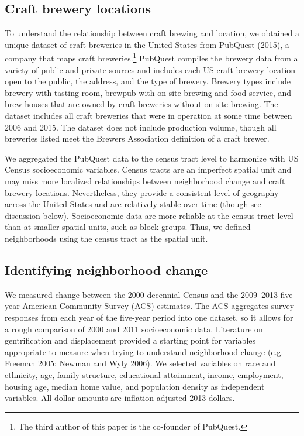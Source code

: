 \documentclass[]{article}
\begin{document}
\subsection{Craft brewery locations}\label{craft-brewery-locations}

To understand the relationship between craft brewing and location, we
obtained a unique dataset of craft breweries in the United States from
PubQuest (2015), a company that maps craft breweries.\footnote{The third
  author of this paper is the co-founder of PubQuest.} PubQuest compiles
the brewery data from a variety of public and private sources and
includes each US craft brewery location open to the public, the address,
and the type of brewery. Brewery types include brewery with tasting
room, brewpub with on-site brewing and food service, and brew houses
that are owned by craft breweries without on-site brewing. The dataset
includes all craft breweries that were in operation at some time between
2006 and 2015. The dataset does not include production volume, though
all breweries listed meet the Brewers Association definition of a craft
brewer.

We aggregated the PubQuest data to the census tract level to harmonize
with US Census socioeconomic variables. Census tracts are an imperfect
spatial unit and may miss more localized relationships between
neighborhood change and craft brewery locations. Nevertheless, they
provide a consistent level of geography across the United States and are
relatively stable over time (though see discussion below). Socioeconomic
data are more reliable at the census tract level than at smaller spatial
units, such as block groups. Thus, we defined neighborhoods using the
census tract as the spatial unit.

\subsection{Identifying neighborhood
change}\label{identifying-neighborhood-change}

We measured change between the 2000 decennial Census and the 2009--2013
five-year American Community Survey (ACS) estimates. The ACS aggregates
survey responses from each year of the five-year period into one
dataset, so it allows for a rough comparison of 2000 and 2011
socioeconomic data. Literature on gentrification and displacement
provided a starting point for variables appropriate to measure when
trying to understand neighborhood change (e.g. Freeman 2005; Newman and
Wyly 2006). We selected variables on race and ethnicity, age, family
structure, educational attainment, income, employment, housing age,
median home value, and population density as independent variables. All
dollar amounts are inflation-adjusted 2013 dollars.
\end{document}
